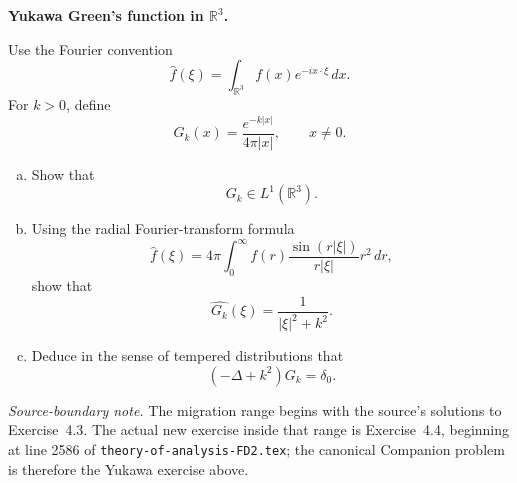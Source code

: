 \begin{problem}[CP-III-0004]
\label{prob:cp-iii-0004}
\textbf{Yukawa Green's function in \(\mathbb R^3\).}

Use the Fourier convention
\[
\widehat f(\xi)
=
\int_{\mathbb R^3}
f(x)e^{-ix\cdot\xi}\,dx.
\]
For \(k>0\), define
\[
G_k(x)
=
\frac{e^{-k|x|}}{4\pi|x|},
\qquad
x\ne0.
\]

\begin{enumerate}[(a)]
\item Show that
\[
G_k\in L^1(\mathbb R^3).
\]

\item Using the radial Fourier-transform formula
\[
\widehat f(\xi)
=
4\pi
\int_0^\infty
f(r)
\frac{\sin(r|\xi|)}{r|\xi|}
r^2\,dr,
\]
show that
\[
\boxed{
\widehat{G_k}(\xi)
=
\frac1{|\xi|^2+k^2}.}
\]

\item Deduce in the sense of tempered distributions that
\[
(-\Delta+k^2)G_k=\delta_0.
\]
\end{enumerate}

\medskip
\noindent
\textit{Source-boundary note.}
The migration range begins with the source's solutions to Exercise~4.3.
The actual new exercise inside that range is Exercise~4.4, beginning at
line 2586 of \texttt{theory-of-analysis-FD2.tex}; the canonical Companion
problem is therefore the Yukawa exercise above.
\end{problem}


